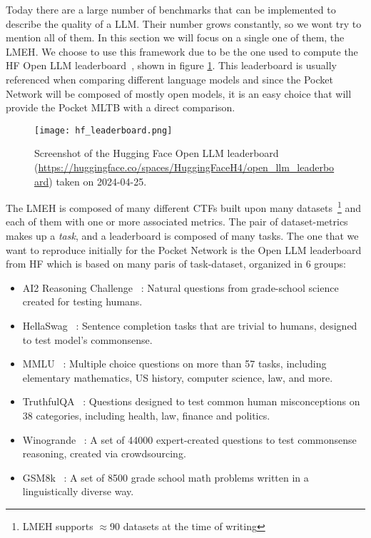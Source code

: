 Today there are a large number of benchmarks that can be implemented to describe the quality of a \gls{LLM}. Their number grows constantly, so we wont try to mention all of them. In this section we will focus on a single one of them, the \gls{LMEH}.
We choose to use this framework due to be the one used to compute the \gls{HF} Open \gls{LLM} leaderboard~\cite{open-llm-leaderboard}, shown in figure \ref{fig:hf_leaderboard}. This leaderboard is usually referenced when comparing different language models and since the Pocket Network will be composed of mostly open models, it is an easy choice that will provide the Pocket \gls{MLTB} with a direct comparison.

\begin{figure}[H]
    \centering
    \texttt{[image: hf\_leaderboard.png]}
    \caption{Screenshot of the Hugging Face Open LLM leaderboard (\url{https://huggingface.co/spaces/HuggingFaceH4/open_llm_leaderboard}) taken on 2024-04-25.}
    \label{fig:hf_leaderboard}
\end{figure}

The \gls{LMEH} is composed of many different \glspl{CTF} built upon many datasets~\footnote{\gls{LMEH} supports $\approx$90 datasets at the time of writing} and each of them with one or more associated metrics. The pair of dataset-metrics makes up a \emph{task}, and a leaderboard is composed of many tasks. The one that we want to reproduce initially for the Pocket Network is the Open \gls{LLM} leaderboard from \gls{HF} which is based on many paris of task-dataset, organized in 6 groups:
\begin{itemize}
    \item AI2 Reasoning Challenge~\cite{clark2018think} : Natural questions from grade-school science created for testing humans.
    \item HellaSwag~\cite{zellers2019hellaswag} : Sentence completion tasks that are trivial to humans, designed to test model's commonsense.
    \item MMLU~\cite{hendrycks2020measuring} : Multiple choice questions on more than 57 tasks, including elementary mathematics, US history, computer science, law, and more.
    \item TruthfulQA~\cite{lin2021truthfulqa} : Questions designed to test common human misconceptions on 38 categories, including health, law, finance and politics.
    \item Winogrande~\cite{sakaguchi2019adversarial} : A set of 44000 expert-created questions to test commonsense reasoning, created via crowdsourcing.
    \item GSM8k~\cite{cobbe2021training} : A set of 8500 grade school math problems written in a linguistically diverse way.
\end{itemize}

